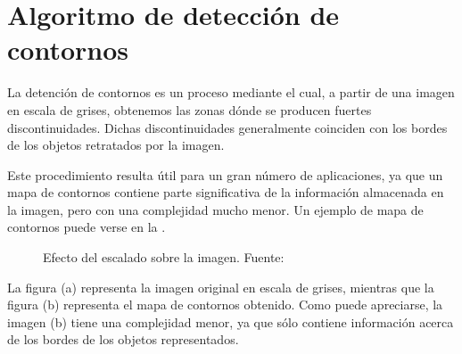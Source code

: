 \section{Algoritmo de detección de contornos}\label{canny}
La detención de contornos es un proceso mediante el cual, a partir de una imagen en escala de grises, obtenemos las zonas dónde se producen fuertes discontinuidades. Dichas discontinuidades generalmente coinciden con los bordes de los objetos retratados por la imagen.

Este procedimiento resulta útil para un gran número de aplicaciones, ya que un mapa de contornos contiene parte significativa de la información almacenada en la imagen, pero con una complejidad mucho menor. \cite{IEEEedge} Un ejemplo de mapa de contornos puede verse en la .\\

\begin{figure}[!h]
\centering {}
\caption{\small{Efecto del escalado sobre la imagen. Fuente:} \cite{ImgProcessMat}} \label{contornos}
\end{figure}

La figura (a) representa la imagen original en escala de grises, mientras que la figura (b) representa el mapa de contornos obtenido. Como puede apreciarse, la imagen (b) tiene una complejidad menor, ya que sólo contiene información acerca de los bordes de los objetos representados. 

